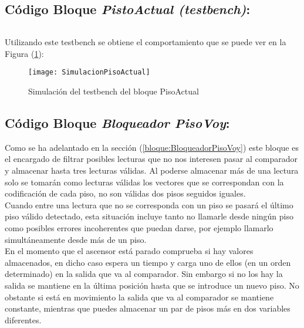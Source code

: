 \subsection{Código Bloque \textit{PistoActual (testbench)}:} \label{code:PisoActual_tb}
    \inputminted[frame=lines,fontsize=\footnotesize,linenos]{vhdl}{CodeFiles/PisoActual_tb.vhd}
    
    Utilizando este testbench se obtiene el comportamiento que se puede ver en la Figura (\ref{fig:SimulacionPisoActual}):

    \begin{figure}[H]
		    \centering
		    \texttt{[image: SimulacionPisoActual]}
		    \caption{Simulación del testbench del bloque PisoActual}
		    \label{fig:SimulacionPisoActual}
	\end{figure}


\subsection{Código Bloque \textit{Bloqueador PisoVoy}:} \label{code:BloqueadorpisoVoy}

    Como se ha adelantado en la sección (\ref{bloque:BloqueadorPisoVoy}) este bloque es el encargado de filtrar posibles lecturas que no nos interesen pasar al comparador y almacenar hasta tres lecturas válidas. Al poderse almacenar más de una lectura solo se tomarán como lecturas válidas los vectores que se correspondan con la codificación de cada piso, no son válidas dos pisos seguidos iguales. \\
    
    Cuando entre una lectura que no se corresponda con un piso se pasará el último piso válido detectado,  esta situación incluye tanto no llamarle desde ningún piso como posibles errores incoherentes que puedan darse, por ejemplo llamarlo simultáneamente desde más de un piso. \\
    
	En el momento que el ascensor está parado comprueba si hay valores almacenados, en dicho caso espera un tiempo y carga uno de ellos (en un orden determinado) en la salida que va al comparador. Sin embargo si no los hay la salida se mantiene en la última posición hasta que se introduce un nuevo piso. No obstante si está en movimiento la salida que va al comparador se mantiene constante, mientras que puedes almacenar un par de pisos más en dos variables diferentes.
	
